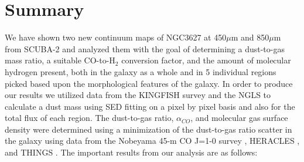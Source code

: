\chapter{Summary}

We have shown two new continuum maps of NGC3627 at 450$\mu$m and 850$\mu$m from SCUBA-2 and analyzed them with the goal of determining a dust-to-gas mass ratio, a suitable CO-to-H$_2$ conversion factor, and the amount of molecular hydrogen present, both in the galaxy as a whole and in 5 individual regions picked based upon the morphological features of the galaxy.  In order to produce our results we utilized data from the KINGFISH survey \citep{kennicutt2011} and the NGLS \citep{wilson2012} to calculate a dust mass using SED fitting on a pixel by pixel basis and also for the total flux of each region.  The dust-to-gas ratio, $\alpha_{CO}$, and molecular gas surface density were determined using a minimization of the dust-to-gas ratio scatter in the galaxy using data from the Nobeyama 45-m CO J=1-0 survey \citep{kuno2007}, HERACLES \citep{reuter1996}, and THINGS \citep{walter2008}.  The important results from our analysis are as follows:


